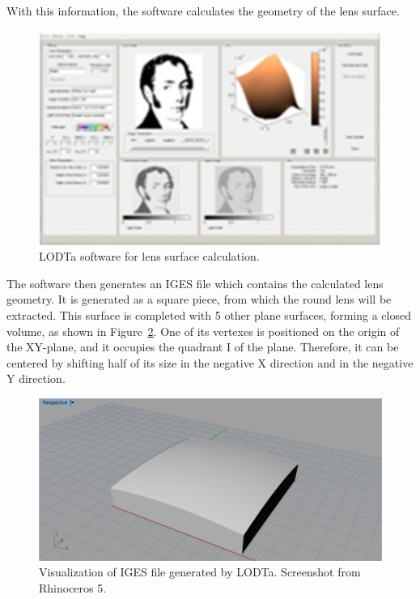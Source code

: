 	With this information, the software calculates the geometry of the lens surface.
	
	\begin{figure}[H]
		\centering
		\captionsetup{justification=centering}
		\includegraphics[width=0.9\linewidth]{Cap2/LODTa/lodta_screenshot.jpg}
		\caption{LODTa software for lens surface calculation.}
		\label{fig:lodta_screenshot}
	\end{figure}
	
	The software then generates an IGES file which contains the calculated lens geometry. It is generated as a square piece, from which the round lens will be extracted. This surface is completed with 5 other plane surfaces, forming a closed volume, as shown in Figure~\ref{fig:lodta_iges}. One of its vertexes is positioned on the origin of the XY-plane, and it occupies the quadrant I of the plane. Therefore, it can be centered by shifting half of its size in the negative X direction and in the negative Y direction.
	
	\begin{figure}[H]
		\centering
		\captionsetup{justification=centering}
		\includegraphics[width=\linewidth]{Cap2/LODTa/lodta_iges.jpg}
		\caption{Visualization of IGES file generated by LODTa. Screenshot from Rhinoceros 5.}
		\label{fig:lodta_iges}
	\end{figure}